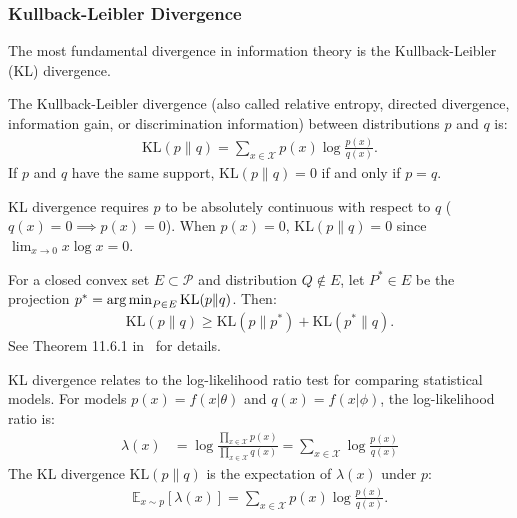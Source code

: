 \subsubsection{Kullback-Leibler Divergence}
The most fundamental divergence in information theory is the Kullback-Leibler (KL) divergence.
\begin{definition}%
	\label{def:kl-divergence}
	The \textnormal{\sffamily Kullback-Leibler divergence} (also called \textnormal{\sffamily relative entropy}, \textnormal{\textsf directed divergence}, \textnormal{\sffamily information gain}, or \textnormal{\sffamily discrimination information}) between distributions $p$ and $q$ is:
	\begin{align}
		\label{eq:KL}
		\text{KL}(p \| q) = \sum_{x \in \mathcal{X}} p(x) \log\frac{p(x)}{q(x)}.
	\end{align}
	If $p$ and $q$ have the same support, $\text{KL}(p \| q) = 0$ if and only if $p = q$.
\end{definition}
\begin{remark}
	KL divergence requires $p$ to be absolutely continuous with respect to $q$ ($q(x) = 0 \implies p(x) = 0$). When $p(x) = 0$, $\text{KL}(p \| q) = 0$ since $\lim_{x \to 0} x\log{x} = 0$.
\end{remark}
\begin{theorem}
	For a closed convex set $E \subset \mathcal{P}$ and distribution $Q \not \in E$, let $P^* \in E$ be the projection $p^* = \operatorname*{arg\,min}_{P \in E} \text{KL}(p \| q)$. Then:
	\begin{align}
		\text{KL}(p \| q) \geq \text{KL}(p \| p^*) + \text{KL}(p^* \| q).
	\end{align}
	See Theorem 11.6.1 in~\cite{ref:cover-thomas} for details.
\end{theorem}
\begin{remark}
	KL divergence relates to the log-likelihood ratio test for comparing statistical models. For models $p(x) = f(x|\theta)$ and $q(x) = f(x|\phi)$, the log-likelihood ratio is:
	\begin{align}
		\lambda(x) & = \log\frac{\prod_{x \in \mathcal{X}} p(x)}{\prod_{x \in \mathcal{X}} q(x)} = \sum_{x \in \mathcal{X}} \log \frac{p(x)}{q(x)}
	\end{align}
	The KL divergence $\text{KL}(p \| q)$ is the expectation of $\lambda(x)$ under $p$:
	\begin{align}
		\mathbb{E}_{x \sim p}[\lambda(x)] = \sum_{x \in \mathcal{X}} p(x)\log \frac{p(x)}{q(x)}.
	\end{align}
\end{remark}
